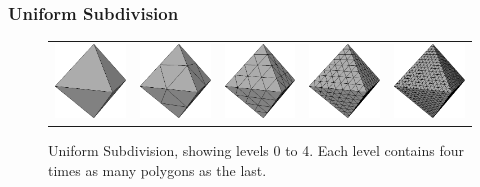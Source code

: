 \subsubsection{\label{sec:dispmapanim:reconstruction:subdivision:uniform}Uniform Subdivision}
\begin{figure}
\begin{center}
\begin{tabular}{ccccc}
\includegraphics[width=2.5cm]{../images/level0} &
\includegraphics[width=2.5cm]{../images/level1} &
\includegraphics[width=2.5cm]{../images/level2} &
\includegraphics[width=2.5cm]{../images/level3} &
\includegraphics[width=2.5cm]{../images/level4} \\
\end{tabular}
\caption[Uniform Subdivision]{\label{fig:uniformsubdiv} Uniform Subdivision, showing levels 0 to 4. Each level contains four times as many polygons as the last. }
\end{center}
\end{figure}

